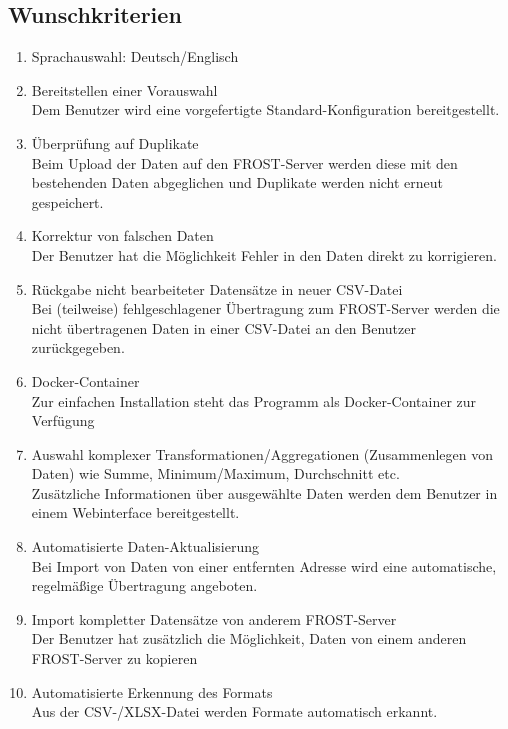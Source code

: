 \documentclass[12 pt]{article}
\begin{document}
	\subsection{Wunschkriterien}
	\begin{enumerate}
		\item Sprachauswahl: Deutsch/Englisch
		\item Bereitstellen einer Vorauswahl \\
		Dem Benutzer wird eine vorgefertigte Standard-Konfiguration bereitgestellt.
		\item Überprüfung auf Duplikate \\
		Beim Upload der Daten auf den FROST-Server werden diese mit den bestehenden Daten abgeglichen und Duplikate werden nicht erneut gespeichert.
		\item Korrektur von falschen Daten \\
		Der Benutzer hat die Möglichkeit Fehler in den Daten direkt zu korrigieren.
		\item Rückgabe nicht bearbeiteter Datensätze in neuer CSV-Datei \\
		Bei (teilweise) fehlgeschlagener Übertragung zum FROST-Server werden die nicht übertragenen Daten in einer CSV-Datei an den Benutzer zurückgegeben.
		\item Docker-Container \\
		Zur einfachen Installation steht das Programm als Docker-Container zur Verfügung
		\item Auswahl komplexer Transformationen/Aggregationen (Zusammenlegen von Daten) wie Summe, Minimum/Maximum, Durchschnitt etc.\\ 
		Zusätzliche Informationen über ausgewählte Daten werden dem Benutzer in einem Webinterface bereitgestellt.
		\item Automatisierte Daten-Aktualisierung \\
		Bei Import von Daten von einer entfernten Adresse wird eine automatische, regelmäßige Übertragung angeboten.
		\item Import kompletter Datensätze von anderem FROST-Server \\
		Der Benutzer hat zusätzlich die Möglichkeit, Daten von einem anderen FROST-Server zu kopieren
		\item Automatisierte Erkennung des Formats \\
		Aus der CSV-/XLSX-Datei werden Formate automatisch erkannt.
		
		
	\end{enumerate}
	
\end{document}
